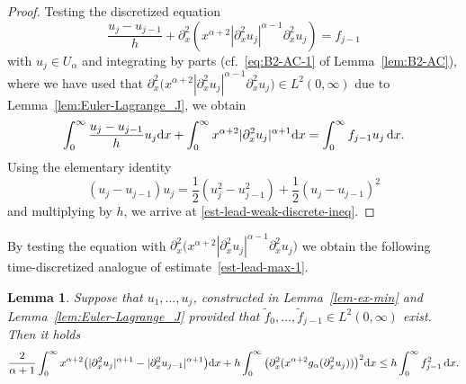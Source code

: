 \documentclass[reqno,12pt]{amsart}
\renewcommand{\d}{\ensuremath{\mathrm{d}}}
\renewcommand{\d}{\ensuremath{{\rm d}}}
\newtheorem{lemma}[theorem]{Lemma}
\numberwithin{equation}{section}
\begin{document}
%
\begin{proof}
Testing the discretized equation
%
\begin{equation*}%
    \frac{u_j - u_{j-1}}{h} 
    +
    \partial_x^2 \left(
    x^{\alpha+2} |\partial_x^2 u_j|^{\alpha-1} \partial_x^2 u_j
    \right)
    =
    f_{j-1}
\end{equation*}
%
with $u_j \in U_\alpha$ and integrating by parts (cf.~\eqref{eq:B2-AC-1} of Lemma~\ref{lem:B2-AC}), where we have used that $\partial_x^2\bigl(x^{\alpha+2} |\partial_x^2 u_j|^{\alpha-1} \partial_x^2 u_j\bigr) \in L^2(0,\infty)$ due to Lemma~\ref{lem:Euler-Lagrange_J}, we obtain
%
\begin{equation*}
    \int_0^\infty \frac{u_j - u_{j-1}}{h} u_j \d x
    +
    \int_0^\infty x^{\alpha+2} |\partial_x^2 u_j|^{\alpha+1} \d x
    =
    \int_0^\infty f_{j-1} u_j\, \d x.
\end{equation*}
%
Using the elementary identity
%
\begin{equation*}
   (u_j-u_{j-1}) u_j = \frac 1 2 (u_j^2 - u_{j-1}^2) + \frac 1 2 (u_j-u_{j-1})^2
\end{equation*}
%
and multiplying by $h$, we arrive at \eqref{est-lead-weak-discrete-ineq}. 
\end{proof}

By testing the equation with $\partial_x^2\bigl(x^{\alpha+2} |\partial_x^2 u_j|^{\alpha-1} \partial_x^2 u_j\bigr)$ we obtain the following time-discretized analogue of estimate~\eqref{est-lead-max-1}.

\begin{lemma}\label{lem-lead-max-discrete}
Suppose that $u_1,\ldots,u_j$, constructed in Lemma~\ref{lem-ex-min} and Lemma~\ref{lem:Euler-Lagrange_J} provided that $\tilde f_0,\ldots, \tilde f_{j-1} \in L^2(0,\infty)$ exist. Then it holds
%
\begin{equation}\label{est-lead-max-discrete}
    \frac{2}{\alpha+1} \int_0^\infty x^{\alpha+2} \big(
    |\partial_x^2 u_j|^{\alpha+1} - |\partial_x^2 u_{j-1}|^{\alpha+1} 
    \big) \d x
    +
    h
    \int_0^\infty \big(\partial_x^2(x^{\alpha+2} g_\alpha(\partial_x^2 u_j))\big)^2 \d x
    \le
    h
    \int_0^\infty f_{j-1}^2\, \d x.
\end{equation}
%
\end{lemma}
%
\end{document}

